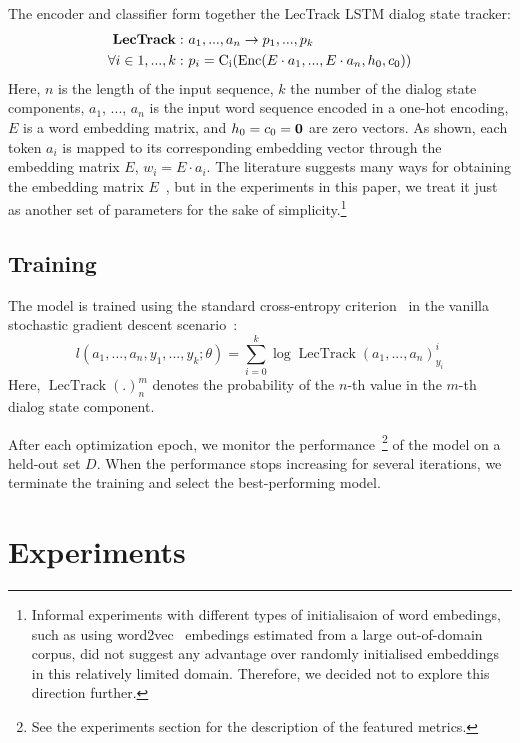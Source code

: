 \documentclass[11pt,twocolumn]{article}
\begin{document}
The encoder and classifier form together the LecTrack LSTM dialog state tracker:
\begin{align*}
\bf{LecTrack}: & ~a_1, ..., a_n \rightarrow p_{1}, ..., p_{k} \\
\forall i \in {1, ..., k}: & ~p_i = \operatorname{C_i}(\operatorname{Enc}(E \cdot a_1, ..., E \cdot a_n, h_0, c_0))
\end{align*}
Here, $n$ is the length of the input sequence, $k$ the number of the dialog state components, $a_1$, ..., $a_n$ is the input word sequence encoded in a one-hot encoding, $E$ is a word embedding matrix, and $h_0=c_0=\bf{0}$ are zero vectors. As shown, each token $a_i$ is mapped to its corresponding embedding vector through the embedding matrix $E$, $w_i=E\cdot a_i$. The literature suggests many ways for obtaining the embedding matrix $E$~\cite{mikolov2013efficient,kim2014convolutional,stratosspectral}, but in the experiments in this paper, we treat it just as another set of parameters for the sake of simplicity.\footnote{Informal experiments with different types of initialisaion of word embedings, such as using word2vec~\cite{mikolov2013efficient} embedings estimated from a large out-of-domain corpus, did not suggest any advantage over randomly initialised embeddings in this relatively limited domain. Therefore, we decided not to explore this direction further.}

\subsection{Training}
The model is trained using the standard cross-entropy criterion~\cite{rubinstein2004cross} in the vanilla stochastic gradient descent scenario~\cite{bottou2010large}:
$$ l(a_1, ..., a_n, y_1, ..., y_k; \theta) = \sum_{i=0}^k \operatorname{log} \operatorname{LecTrack}(a_1, ..., a_n)^i_{y_i}$$
Here, $\operatorname{LecTrack}(.)^m_n$ denotes the probability of the $n$-th value in the $m$-th dialog state component.

After each optimization epoch, we monitor the performance~\footnote{See the experiments section for the description of the featured metrics.} of the model on a held-out set $D$. When the performance stops increasing for several iterations, we terminate the training and select the best-performing model.


\section{Experiments}
\label{sec:experiments}
\end{document}
